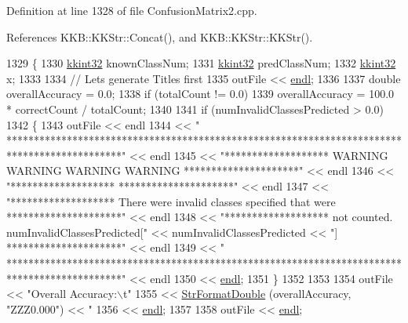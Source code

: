 Definition at line 1328 of file Confusion\+Matrix2.\+cpp.



References K\+K\+B\+::\+K\+K\+Str\+::\+Concat(), and K\+K\+B\+::\+K\+K\+Str\+::\+K\+K\+Str().


\begin{DoxyCode}
1329 \{
1330   \hyperlink{namespace_k_k_b_a8fa4952cc84fda1de4bec1fbdd8d5b1b}{kkint32} knownClassNum;
1331   \hyperlink{namespace_k_k_b_a8fa4952cc84fda1de4bec1fbdd8d5b1b}{kkint32} predClassNum;
1332   \hyperlink{namespace_k_k_b_a8fa4952cc84fda1de4bec1fbdd8d5b1b}{kkint32} x;
1333 
1334   \textcolor{comment}{// Lets generate Titles first}
1335   outFile << \hyperlink{namespace_k_k_b_ad1f50f65af6adc8fa9e6f62d007818a8}{endl};
1336 
1337   \textcolor{keywordtype}{double}  overallAccuracy = 0.0;
1338   \textcolor{keywordflow}{if}  (totalCount != 0.0)
1339    overallAccuracy = 100.0 * correctCount / totalCount;
1340 
1341   \textcolor{keywordflow}{if}  (numInvalidClassesPredicted > 0.0)
1342   \{
1343     outFile << endl 
1344             << \textcolor{stringliteral}{"
      *********************************************************************************************"}  << endl
1345             << \textcolor{stringliteral}{"*******************        WARNING    WARNING   WARNING  WARNING       
       *********************"}  << endl
1346             << \textcolor{stringliteral}{"*******************                                                    
       *********************"}  << endl
1347             << \textcolor{stringliteral}{"*******************   There were invalid classes specified that were   
       *********************"}  << endl
1348             << \textcolor{stringliteral}{"*******************   not counted.    numInvalidClassesPredicted["} << 
      numInvalidClassesPredicted << \textcolor{stringliteral}{"] *********************"} << endl
1349             << \textcolor{stringliteral}{"
      *********************************************************************************************"}  << endl
1350             << \hyperlink{namespace_k_k_b_ad1f50f65af6adc8fa9e6f62d007818a8}{endl};
1351   \}
1352 
1353 
1354   outFile  << \textcolor{stringliteral}{"Overall Accuracy:\(\backslash\)t"} 
1355            << \hyperlink{namespace_k_k_b_a1a40a40e955fa5417a7cdd990e0021b1}{StrFormatDouble} (overallAccuracy, \textcolor{stringliteral}{"ZZZ0.000"}) << \textcolor{stringliteral}{"%
1356            << \hyperlink{namespace_k_k_b_ad1f50f65af6adc8fa9e6f62d007818a8}{endl};
1357 
1358   outFile  << \hyperlink{namespace_k_k_b_ad1f50f65af6adc8fa9e6f62d007818a8}{endl};
}
\end{DoxyCode}
